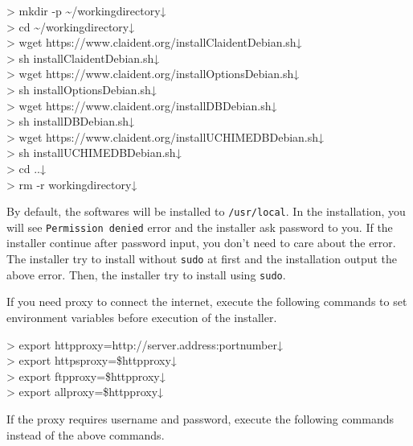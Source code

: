 \documentclass[titlepage,10pt,a4paper,english]{jsbook}
\newenvironment{cmd}{\begin{oframed}\raggedright\ttfamily\footnotesize\setlength{\baselineskip}{1.4em}}{\end{oframed}\vspace{-1em}}
\begin{document}
\begin{cmd}
{\textgreater} mkdir -p {\textasciitilde}/workingdirectory↓\\
{\textgreater} cd {\textasciitilde}/workingdirectory↓\\
{\textgreater} wget https://www.claident.org/installClaident{\textunderscore}Debian.sh↓\\
{\textgreater} sh installClaident{\textunderscore}Debian.sh↓\\
{\textgreater} wget https://www.claident.org/installOptions{\textunderscore}Debian.sh↓\\
{\textgreater} sh installOptions{\textunderscore}Debian.sh↓\\
{\textgreater} wget https://www.claident.org/installDB{\textunderscore}Debian.sh↓\\
{\textgreater} sh installDB{\textunderscore}Debian.sh↓\\
{\textgreater} wget https://www.claident.org/installUCHIMEDB{\textunderscore}Debian.sh↓\\
{\textgreater} sh installUCHIMEDB{\textunderscore}Debian.sh↓\\
{\textgreater} cd ..↓\\
{\textgreater} rm -r workingdirectory↓
\end{cmd}

By default, the softwares will be installed to \texttt{/usr/local}.
In the installation, you will see \texttt{Permission denied} error and the installer ask password to you.
If the installer continue after password input, you don't need to care about the error.
The installer try to install without \texttt{sudo} at first and the installation output the above error.
Then, the installer try to install using \texttt{sudo}.

If you need proxy to connect the internet, execute the following commands to set environment variables before execution of the installer.

\begin{cmd}
{\textgreater} export http{\textunderscore}proxy=http://server.address:portnumber↓\\
{\textgreater} export https{\textunderscore}proxy=\$http{\textunderscore}proxy↓\\
{\textgreater} export ftp{\textunderscore}proxy=\$http{\textunderscore}proxy↓\\
{\textgreater} export all{\textunderscore}proxy=\$http{\textunderscore}proxy↓
\end{cmd}

If the proxy requires username and password, execute the following commands instead of the above commands.
\end{document}
